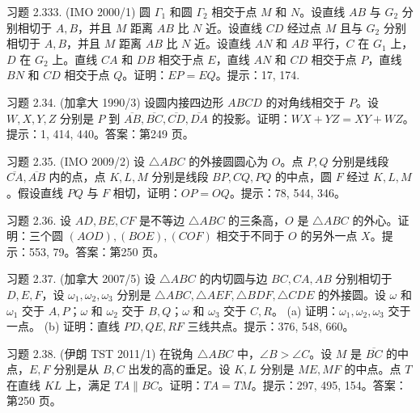 \begin{exercise}
    习题 2.333. (IMO 2000/1) 圆 $\Gamma_1$ 和圆 $\Gamma_2$ 相交于点 $M$ 和 $N$。设直线 $AB$ 与 $G_2$ 分别相切于 $A, B$，并且 $M$ 距离 $AB$ 比 $N$ 近。设直线 $CD$ 经过点 $M$ 且与 $G_2$ 分别相切于 $A, B$，并且 $M$ 距离 $AB$ 比 $N$ 近。设直线 $AN$ 和 $AB$ 平行，$C$ 在 $G_1$ 上，$D$ 在 $G_2$ 上。直线 $CA$ 和 $DB$ 相交于点 $E$，直线 $AN$ 和 $CD$ 相交于点 $P$，直线 $BN$ 和 $CD$ 相交于点 $Q$。证明：$EP = EQ$。提示：17, 174.
\end{exercise}

\begin{exercise}
    习题 2.34. (加拿大 1990/3) 设圆内接四边形 $ABCD$ 的对角线相交于 $P$。设 $W, X, Y, Z$ 分别是 $P$ 到 $\overline{AB}, \overline{BC}, \overline{CD}, \overline{DA}$ 的投影。证明：$WX + YZ = XY + WZ$。提示：1, 414, 440。答案：第249 页。
\end{exercise}

\begin{exercise}
    习题 2.35. (IMO 2009/2) 设 $\triangle ABC$ 的外接圆圆心为 $O$。点 $P, Q$ 分别是线段 $\overline{CA}, \overline{AB}$ 内的点，点 $K, L, M$ 分别是线段 $BP, CQ, PQ$ 的中点，圆 $F$ 经过 $K, L, M$。假设直线 $PQ$ 与 $F$ 相切，证明：$OP = OQ$。提示：78, 544, 346。
\end{exercise}

\begin{exercise}
习题 2.36. 设 $AD, BE, CF$ 是不等边 $\triangle ABC$ 的三条高，$O$ 是 $\triangle ABC$ 的外心。证明：三个圆 $(AOD), (BOE), (COF)$ 相交于不同于 $O$ 的另外一点 $X$。提示：553, 79。答案：第250 页。

\end{exercise}


\begin{exercise}
习题 2.37. (加拿大 2007/5) 设 $\triangle ABC$ 的内切圆与边 $BC, CA, AB$ 分别相切于 $D, E, F$，设 $\omega_1, \omega_2, \omega_3$ 分别是 $\triangle ABC, \triangle AEF, \triangle BDF, \triangle CDE$ 的外接圆。设 $\omega$ 和 $\omega_1$ 交于 $A, P$；$\omega$ 和 $\omega_2$ 交于 $B, Q$；$\omega$ 和 $\omega_3$ 交于 $C, R$。
(a) 证明：$\omega_1, \omega_2, \omega_3$ 交于一点。
(b) 证明：直线 $PD, QE, RF$ 三线共点。提示：376, 548, 660。
    
\end{exercise}


\begin{exercise}
习题 2.38. (伊朗 TST 2011/1) 在锐角 $\triangle ABC$ 中，$\angle B > \angle C$。设 $M$ 是 $\overline{BC}$ 的中点，$E, F$ 分别是从 $B, C$ 出发的高的垂足。设 $K, L$ 分别是 $ME, MF$ 的中点。点 $T$ 在直线 $KL$ 上，满足 $TA \parallel BC$。证明：$TA = TM$。提示：297, 495, 154。答案：第250 页。
    
\end{exercise}
